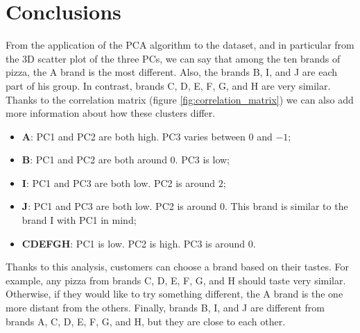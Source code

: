 \documentclass[../main.tex]{subfiles}
\begin{document}
\chapter{Conclusions}
From the application of the PCA algorithm to the dataset, and in particular from the 3D scatter plot of the three PCs, we can say that among the ten brands of pizza, the A brand is the most different. Also, the brands B, I, and J are each part of his group. In contrast, brands C, D, E, F, G, and H are very similar. Thanks to the correlation matrix (figure \ref{fig:correlation_matrix}) we can also add more information about how these clusters differ.
\begin{itemize}
    \item \textbf{A}: PC1 and PC2 are both high. PC3 varies between $0$ and $-1$;
    \item \textbf{B}: PC1 and PC2 are both around $0$. PC3 is low;
    \item \textbf{I}: PC1 and PC3 are both low. PC2 is around $2$;
    \item \textbf{J}: PC1 and PC3 are both low. PC2 is around $0$. This brand is similar to the brand I with PC1 in mind;
    \item \textbf{CDEFGH}: PC1 is low. PC2 is high. PC3 is around $0$.
\end{itemize}

Thanks to this analysis, customers can choose a brand based on their tastes. For example, any pizza from brands C, D, E, F, G, and H should taste very similar. Otherwise, if they would like to try something different, the A brand is the one more distant from the others. Finally, brands B, I, and J are different from brands A, C, D, E, F, G, and H, but they are close to each other.
\end{document}
